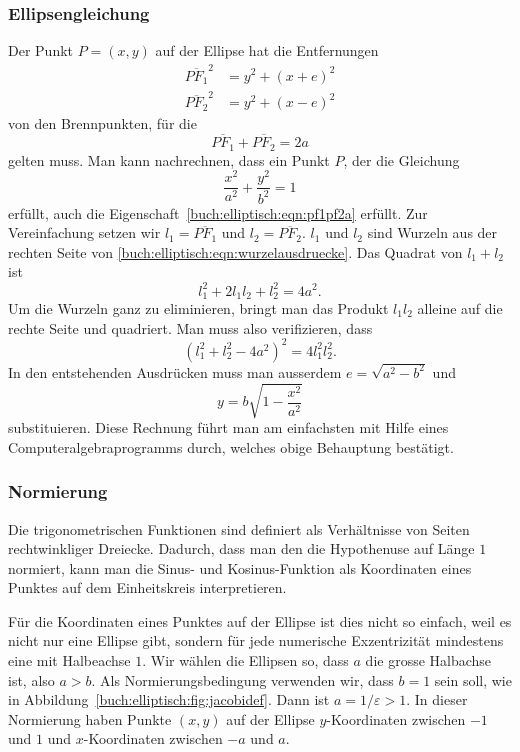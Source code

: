 %
%
\subsubsection{Ellipsengleichung}
Der Punkt $P=(x,y)$ auf der Ellipse hat die Entfernungen
\begin{equation}
\begin{aligned}
\overline{PF_1}^2
&=
y^2 + (x+e)^2
\\
\overline{PF_2}^2
&=
y^2 + (x-e)^2
\end{aligned}
\label{buch:elliptisch:eqn:wurzelausdruecke}
\end{equation}
von den Brennpunkten, für die 
\begin{equation}
\overline{PF_1}+\overline{PF_2}
=
2a
\label{buch:elliptisch:eqn:pf1pf2a}
\end{equation}
gelten muss.
Man kann nachrechnen, dass ein Punkt $P$, der die Gleichung
\[
\frac{x^2}{a^2} + \frac{y^2}{b^2}=1
\]
erfüllt, auch die Eigenschaft~\eqref{buch:elliptisch:eqn:pf1pf2a}
erfüllt.
Zur Vereinfachung setzen wir $l_1=\overline{PF_1}$ und $l_2=\overline{PF_2}$.
$l_1$ und $l_2$ sind Wurzeln aus der rechten Seite von
\eqref{buch:elliptisch:eqn:wurzelausdruecke}.
Das Quadrat von $l_1+l_2$ ist
\[
l_1^2 + 2l_1l_2 + l_2^2 = 4a^2.
\]
Um die Wurzeln ganz zu eliminieren, bringt man das Produkt $l_1l_2$ alleine
auf die rechte Seite und quadriert.
Man muss also verifizieren, dass
\[
(l_1^2 + l_2^2 -4a^2)^2 = 4l_1^2l_2^2.
\]
In den entstehenden Ausdrücken muss man ausserdem $e=\sqrt{a^2-b^2}$ und
\[
y=b\sqrt{1-\frac{x^2}{a^2}}
\]
substituieren.
Diese Rechnung führt man am einfachsten mit Hilfe eines
Computeralgebraprogramms durch, welches obige Behauptung bestätigt.

%
%
\subsubsection{Normierung}
Die trigonometrischen Funktionen sind definiert als Verhältnisse 
von Seiten rechtwinkliger Dreiecke.
Dadurch, dass man den die Hypothenuse auf Länge $1$ normiert, 
kann man die Sinus- und Kosinus-Funktion als Koordinaten eines
Punktes auf dem Einheitskreis interpretieren.

Für die Koordinaten eines Punktes auf der Ellipse ist dies nicht so einfach,
weil es nicht nur eine Ellipse gibt, sondern für jede numerische Exzentrizität
mindestens eine mit Halbeachse $1$.
Wir wählen die Ellipsen so, dass $a$ die grosse Halbachse ist, also $a>b$.
Als Normierungsbedingung verwenden wir, dass $b=1$ sein soll, wie in
Abbildung~\ref{buch:elliptisch:fig:jacobidef}.
Dann ist $a=1/\varepsilon>1$.
In dieser Normierung haben Punkte $(x,y)$ auf der Ellipse $y$-Koordinaten
zwischen $-1$ und $1$ und $x$-Koordinaten zwischen $-a$ und $a$.

